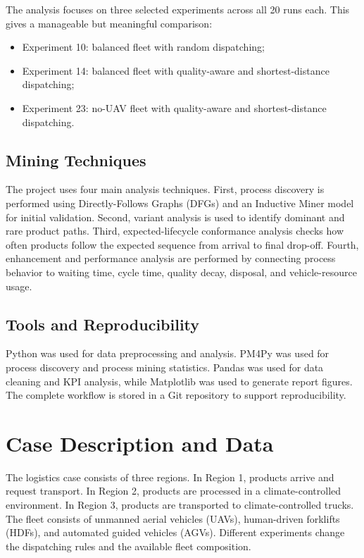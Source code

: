 \documentclass[conference]{IEEEtran}
\begin{document}
The analysis focuses on three selected experiments across all 20 runs each. This gives a manageable but meaningful comparison:

\begin{itemize}
\item Experiment 10: balanced fleet with random dispatching;
\item Experiment 14: balanced fleet with quality-aware and shortest-distance dispatching;
\item Experiment 23: no-UAV fleet with quality-aware and shortest-distance dispatching.
\end{itemize}

\subsection{Mining Techniques}

The project uses four main analysis techniques. First, process discovery is performed using Directly-Follows Graphs (DFGs) and an Inductive Miner model for initial validation. Second, variant analysis is used to identify dominant and rare product paths. Third, expected-lifecycle conformance analysis checks how often products follow the expected sequence from arrival to final drop-off. Fourth, enhancement and performance analysis are performed by connecting process behavior to waiting time, cycle time, quality decay, disposal, and vehicle-resource usage.

\subsection{Tools and Reproducibility}

Python was used for data preprocessing and analysis. PM4Py was used for process discovery and process mining statistics. Pandas was used for data cleaning and KPI analysis, while Matplotlib was used to generate report figures. The complete workflow is stored in a Git repository to support reproducibility.

\section{Case Description and Data}

The logistics case consists of three regions. In Region 1, products arrive and request transport. In Region 2, products are processed in a climate-controlled environment. In Region 3, products are transported to climate-controlled trucks. The fleet consists of unmanned aerial vehicles (UAVs), human-driven forklifts (HDFs), and automated guided vehicles (AGVs). Different experiments change the dispatching rules and the available fleet composition.
\end{document}
